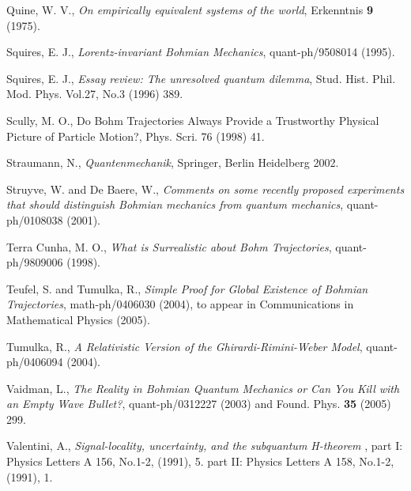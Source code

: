 \begin{thebibliography}{10}
 Quine, W. V., {\em On empirically equivalent systems of the 
    world}, Erkenntnis {\bf 9} (1975). 




 Squires, E. J., {\em Lorentz-invariant Bohmian Mechanics}, 
  quant-ph/9508014 (1995). 

 Squires, E. J., {\em Essay review: The unresolved quantum dilemma}, Stud. Hist. Phil. Mod. Phys. Vol.27, No.3 
(1996) 389.

 Scully, M. O., {Do Bohm Trajectories Always Provide a Trustworthy Physical Picture of Particle Motion?}, Phys. 
  Scri. 76 (1998) 41. 

 Straumann, N., {\em Quantenmechanik}, Springer, Berlin
  Heidelberg  2002.

Struyve, W. and De Baere, W., {\em Comments on some recently proposed experiments that 
should distinguish Bohmian mechanics from quantum mechanics}, quant-ph/0108038 (2001).


 Terra Cunha, M. O., {\em What is Surrealistic about Bohm
Trajectories}, quant-ph/9809006 (1998).

 Teufel, S. and Tumulka, R., {\em Simple Proof for Global
    Existence of Bohmian Trajectories}, math-ph/0406030 (2004), to appear in Communications in Mathematical Physics (2005).

 Tumulka, R., {\em A Relativistic Version of the Ghirardi-Rimini-Weber Model}, quant-ph/0406094 (2004).

 Vaidman, L., {\em The Reality in Bohmian Quantum Mechanics or Can You 
  Kill with an Empty Wave Bullet?}, quant-ph/0312227 (2003) and Found. Phys. {\bf 35} (2005) 299.

 Valentini, A., {\em Signal-locality, uncertainty, and the
    subquantum H-theorem }, part I: Physics Letters A 156, No.1-2, (1991), 5.
     part II: Physics Letters A 158, No.1-2, (1991), 1.


\end{thebibliography}
